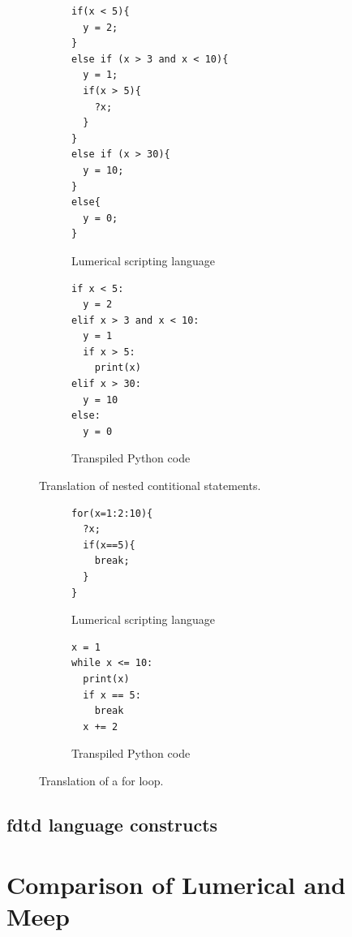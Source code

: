 \begin{figure}[H]\label{fig:lumerical-pyhton-expression}
  \centering

  \begin{subfigure}[t]{0.4\textwidth}
    \begin{lstlisting}[style=lumerical]
if(x < 5){
  y = 2;
}
else if (x > 3 and x < 10){
  y = 1;
  if(x > 5){
    ?x;
  }
}
else if (x > 30){
  y = 10;
}
else{
  y = 0;
}
    \end{lstlisting}
    \caption{Lumerical scripting language}
  \end{subfigure}
  \hfill
  \begin{subfigure}[t]{0.4\textwidth}
    \begin{lstlisting}[style=python]
if x < 5:
  y = 2
elif x > 3 and x < 10:
  y = 1
  if x > 5:
    print(x)
elif x > 30:
  y = 10
else:
  y = 0
    \end{lstlisting}
    \caption{Transpiled Python code}
  \end{subfigure}

  \caption{Translation of nested contitional statements.}
\end{figure}




\begin{figure}[H]\label{fig:lumerical-pyhton-expression}
  \centering

  \begin{subfigure}[t]{0.4\textwidth}
    \begin{lstlisting}[style=lumerical]
for(x=1:2:10){
  ?x;
  if(x==5){
    break;
  }
}
    \end{lstlisting}
    \caption{Lumerical scripting language}
  \end{subfigure}
  \hfill
  \begin{subfigure}[t]{0.4\textwidth}
    \begin{lstlisting}[style=python]
x = 1
while x <= 10:
  print(x)
  if x == 5:
    break
  x += 2
    \end{lstlisting}
    \caption{Transpiled Python code}
  \end{subfigure}

  \caption{Translation of a for loop.}
\end{figure}

\subsection{\gls{fdtd} language constructs}


\section{Comparison of Lumerical and Meep}



